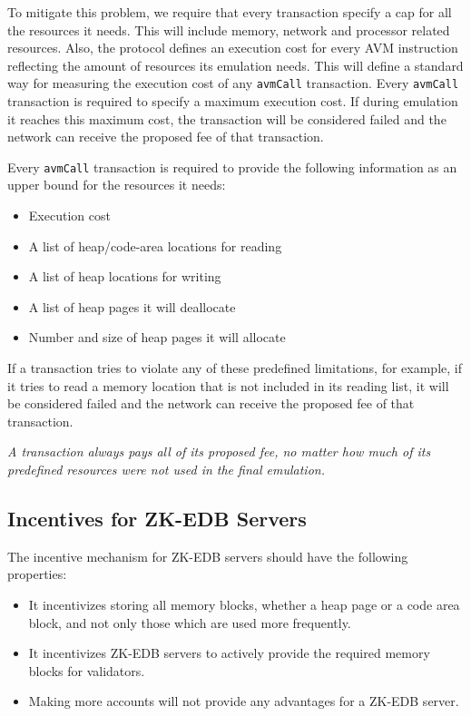 \documentclass[a4paper]{report}
\begin{document}
    To mitigate this problem, we require that every transaction specify a cap for all the resources it needs. This
    will include memory, network and processor related resources. Also, the protocol defines an execution cost for
    every AVM instruction reflecting the amount of resources its emulation needs. This will define a standard way for
    measuring the execution cost of any \texttt{avmCall} transaction. Every \texttt{avmCall} transaction is required
    to specify a maximum execution cost. If during emulation it reaches this maximum cost, the transaction will be
    considered failed and the network can receive the proposed fee of that transaction.

    Every \texttt{avmCall} transaction is required to provide the following information as an upper bound for the
    resources it needs:

    \begin{itemize}
        \item Execution cost
        \item A list of heap/code-area locations for reading
        \item A list of heap locations for writing
        \item A list of heap pages it will deallocate
        \item Number and size of heap pages it will allocate
    \end{itemize}

    If a transaction tries to violate any of these predefined limitations, for example, if it tries to read a memory
    location that is not included in its reading list, it will be considered failed and the network can receive the
    proposed fee of that transaction.

    \emph{A transaction always pays all of its proposed fee, no matter how much of its predefined resources were not
    used in the final emulation.}

    \subsection{Incentives for ZK-EDB Servers}\label{subsec:zk-edb-servers}

    The incentive mechanism for ZK-EDB servers should have the following properties:

    \begin{itemize}
        \item It incentivizes storing all memory blocks, whether a heap page or a code area block, and not only those
        which are used more frequently.
        \item It incentivizes ZK-EDB servers to actively provide the required memory blocks for validators.
        \item Making more accounts will not provide any advantages for a ZK-EDB server.
    \end{itemize}
\end{document}
